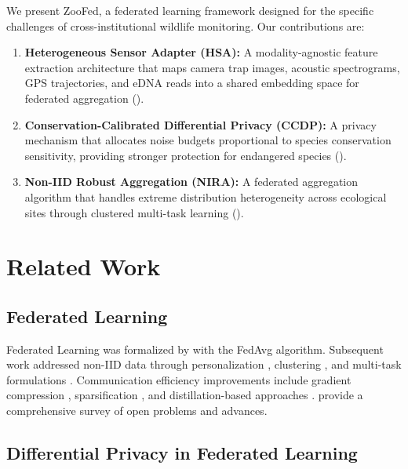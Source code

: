 \documentclass[11pt,a4paper]{article}
\begin{document}
We present ZooFed, a federated learning framework designed for the specific challenges of cross-institutional wildlife monitoring.
Our contributions are:

\begin{enumerate}[leftmargin=*]
    \item \textbf{Heterogeneous Sensor Adapter (HSA):} A modality-agnostic feature extraction architecture that maps camera trap images, acoustic spectrograms, GPS trajectories, and eDNA reads into a shared embedding space for federated aggregation ().
    \item \textbf{Conservation-Calibrated Differential Privacy (CCDP):} A privacy mechanism that allocates noise budgets proportional to species conservation sensitivity, providing stronger protection for endangered species ().
    \item \textbf{Non-IID Robust Aggregation (NIRA):} A federated aggregation algorithm that handles extreme distribution heterogeneity across ecological sites through clustered multi-task learning ().
\end{enumerate}

\section{Related Work}
\label{sec:related}

\subsection{Federated Learning}

Federated Learning was formalized by \citet{mcmahan2017communication} with the FedAvg algorithm.
Subsequent work addressed non-IID data through personalization \citep{li2020federated}, clustering \citep{ghosh2020efficient}, and multi-task formulations \citep{smith2017federated}.
Communication efficiency improvements include gradient compression \citep{alistarh2017qsgd}, sparsification \citep{stich2018sparsified}, and distillation-based approaches \citep{lin2020ensemble}.
\citet{kairouz2021advances} provide a comprehensive survey of open problems and advances.

\subsection{Differential Privacy in Federated Learning}
\end{document}
